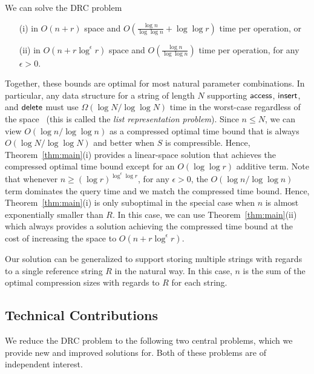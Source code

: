 \begin{theorem}\label{thm:main}
We can solve the DRC problem
\begin{itemize}
\item[(i)] in $O(n + r)$ space and $O\left(\frac{\log n}{\log \log n} + \log \log r\right)$ time per operation, or
\item[(ii)] in $O(n + r \log^\epsilon r)$ space and $O\left(\frac{\log n}{\log \log n}\right)$ time per operation, for any $\epsilon>0$.
\end{itemize}

\end{theorem}
Together, these bounds are optimal for most natural parameter combinations. In particular, any data structure for a string of length $N$ supporting $\mathsf{access}$, $\mathsf{insert}$, and $\mathsf{delete}$ must use $\Omega(\log N/\log \log N)$ time in the worst-case regardless of the space~\cite{fredman1989cell} (this is called the \emph{list representation problem}). Since $n \leq N$, we can view  $O(\log n /\log \log n)$ as a compressed optimal time bound that is always $O(\log N/\log \log N)$ and better when $S$ is compressible. Hence, Theorem~\ref{thm:main}(i) provides a linear-space solution that achieves the compressed optimal time bound except for an $O(\log \log r)$ additive term. Note that whenever $n \geq (\log r)^{\log^\epsilon \log r}$, for any $\epsilon>0$, the $O(\log n/\log \log n)$ term dominates the query time and we match the compressed time bound. Hence, Theorem~\ref{thm:main}(i) is only suboptimal in the special case when $n$ is almost exponentially smaller than $R$. In this case, we can use Theorem~\ref{thm:main}(ii) which always provides a solution achieving the compressed time bound at the cost of increasing the space to $O(n + r\log^\epsilon r)$.

Our solution can be generalized to support storing multiple strings with regards to a single reference string $R$ in the natural way. In this case, $n$ is the sum of the optimal compression sizes with regards to $R$ for each string.

\subsection{Technical Contributions}
We reduce the DRC problem to the following two central problems, which we provide new and improved solutions for. Both of these problems are of independent interest.

